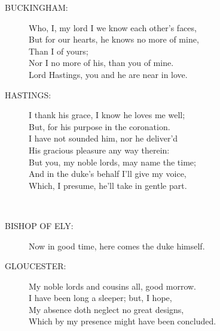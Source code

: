 \documentclass{article}
\begin{document}
\begin{description}
\item[BUCKINGHAM:] 
\hspace{1pt}Who, I, my lord I we know each other's faces,\\
\hspace{1pt}But for our hearts, he knows no more of mine,\\
\hspace{1pt}Than I of yours;\\
\hspace{1pt}Nor I no more of his, than you of mine.\\
\hspace{1pt}Lord Hastings, you and he are near in love.\\
\end{description}
\begin{description}
\item[HASTINGS:] 
\hspace{1pt}I thank his grace, I know he loves me well;\\
\hspace{1pt}But, for his purpose in the coronation.\\
\hspace{1pt}I have not sounded him, nor he deliver'd\\
\hspace{1pt}His gracious pleasure any way therein:\\
\hspace{1pt}But you, my noble lords, may name the time;\\
\hspace{1pt}And in the duke's behalf I'll give my voice,\\
\hspace{1pt}Which, I presume, he'll take in gentle part.\\
\end{description}
\\
\begin{description}
\item[BISHOP OF ELY:] 
\hspace{1pt}Now in good time, here comes the duke himself.\\
\end{description}
\begin{description}
\item[GLOUCESTER:] 
\hspace{1pt}My noble lords and cousins all, good morrow.\\
\hspace{1pt}I have been long a sleeper; but, I hope,\\
\hspace{1pt}My absence doth neglect no great designs,\\
\hspace{1pt}Which by my presence might have been concluded.\\
\end{description}
\end{document}
